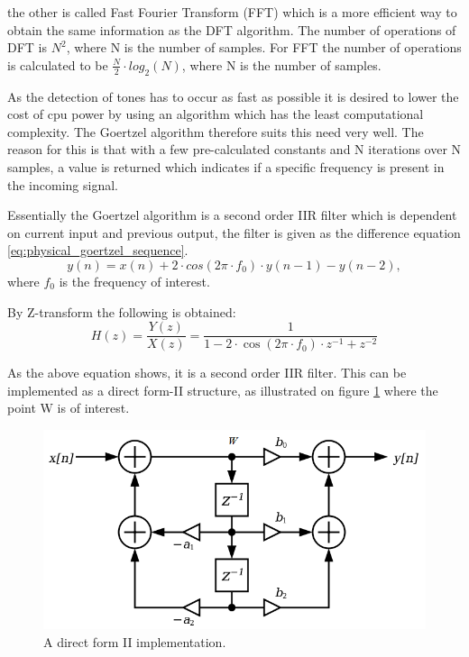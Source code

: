 	
	the other is called Fast Fourier Transform (FFT) which is a more efficient way to obtain the same information
	as the DFT algorithm. The number of operations of DFT \cite[p. 124]{DSP} is $N^2$, where N is the number of samples.
	For FFT \cite[p. 124]{DSP} the number of operations is calculated to be $\frac{N}{2}\cdot log_{2}(N)$,
	where N is the number of samples.
	
	As the detection of tones has to occur as fast as possible it is desired to lower the cost of cpu power by using 
	an algorithm which has the least computational complexity. The Goertzel algorithm therefore suits this need very well.
	The reason for this is that with a few pre-calculated constants and N iterations over N samples, a value is returned
	which indicates if a specific frequency is present in the incoming signal.
	
	Essentially the Goertzel algorithm is a second order IIR filter which is dependent on current input and previous
	output, the filter is given as the difference equation \ref{eq:physical_goertzel_sequence}.
	\begin{equation}y(n) = x(n) + 2\cdot cos(2\pi \cdot f_{0})\cdot y(n - 1) - y(n - 2),\label{eq:physical_goertzel_sequence}\end{equation} where $f_{0}$ is the frequency of interest.
	
	By Z-transform the following is obtained:
	\begin{equation}H(z) = \frac{Y(z)}{X(z)} = \frac{1}{1 - 2\cdot \cos(2\pi \cdot f_{0})\cdot z^{-1} + z^{-2}}\end{equation}
	
	
	As the above equation shows, it is a second order IIR filter. This can be implemented as a direct form-II structure, as illustrated on figure \ref{fig:physical_biquad_filter} where the point W is of interest.
	
	\begin{figure}[htb]
		\begin{center}
		\includegraphics[scale=0.6,trim=0 0 0 0]{content/graphics/physical/physical_biquad_filter.png}%
		\caption{A direct form II implementation.}
		\label{fig:physical_biquad_filter}
		\end{center}
	\end{figure}
	
